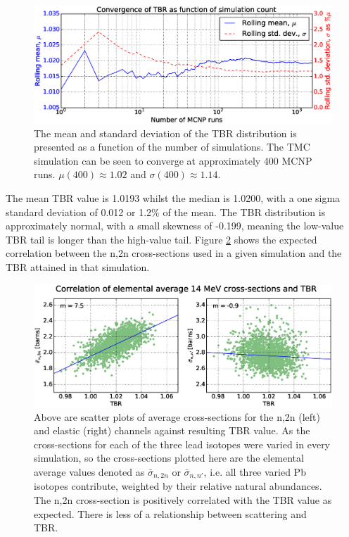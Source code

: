 \begin{figure}[ht]
	\includegraphics[width=\textwidth]{hcll_convergence_1559}
	\caption{The mean and standard deviation of the TBR distribution is presented as a function of the number of simulations. The TMC simulation can be seen to converge at approximately 400 MCNP runs. $\mu(400) \approx 1.02$ and $\sigma(400) \approx 1.14$.}
	\label{fig:convergence}
\end{figure}

The mean TBR value is 1.0193 whilst the median is 1.0200, with a one sigma standard deviation of 0.012 or 1.2\% of the mean. The TBR distribution is approximately normal, with a small skewness of -0.199, meaning the low-value TBR tail is longer than the high-value tail. Figure \ref{fig:tbr_n2n} shows the expected correlation between the n,2n cross-sections used in a given simulation and the TBR attained in that simulation.

\begin{figure}[ht]
  \centering
	\includegraphics[width=\textwidth]{pb_tbr_n2n_el_corr}
	\caption{Above are scatter plots of average cross-sections for the n,2n (left) and elastic (right) channels against resulting TBR value. As the cross-sections for each of the three lead isotopes were varied in every simulation, so the cross-sections plotted here are the elemental average values denoted as $\bar{\sigma}_{n,2n}$ or $\bar{\sigma}_{n,n'}$, i.e. all three varied Pb isotopes contribute, weighted by their relative natural abundances. The n,2n cross-section is positively correlated with the TBR value as expected. There is less of a relationship between scattering and TBR.}
	\label{fig:tbr_n2n}
\end{figure}

